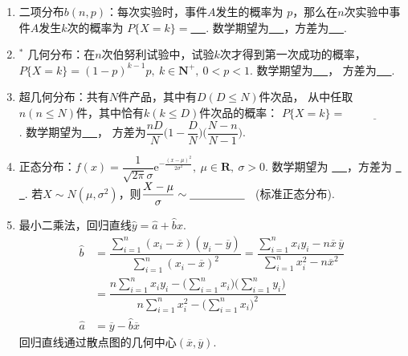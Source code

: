 \documentclass{article}
\newif\ifte
\newcommand{\e}{\mathrm{e}}
\renewcommand\leq\leqslant
\begin{document}
\begin{multicols}{2}
\begin{enumerate}[leftmargin=20pt]
\item 二项分布$ b(n,p) $：每次实验时，事件$ A $发生的概率为
$ p $，那么在$ n $次实验中事件$ A $发生$ k $次的概率为
$ P\{X=k\}= $\underline{\ \ifte $ C_n^kp^k(1-p)^{n-k} $
    \else \hspace{2cm} \fi\ }. 数学期望为\underline{\ \ifte 
$ np $ \else \hspace{1cm} \fi\ }，方差为\underline{\ \ifte 
$ np(1-p) $ \else \hspace{2cm} \fi\ }. 

\item $^*$ 几何分布：在$ n $次伯努利试验中，试验$ k $次才得到第一次成功的概率，$ P\{X=k\}=(1-p)^{k-1}p ,\ k\in \textbf{N}^+,\ 0<p<1 $. 
数学期望为\underline{\ \ifte $ \dfrac{1}{p} $\else \hspace{1cm} \fi\ }，
方差为\underline{\ \ifte $ \dfrac{1-p}{p^2} $\else \hspace{2cm} \fi\ }. 

\item 超几何分布：共有$ N $件产品，其中有$ D (D\leq N) $件次品，
从中任取$ n(n\leq N)$件，其中恰有$ k(k\leq D) $件次品的概率：
$ P\{X=k\}=\underline{\ \ifte \dfrac{C_D^kC_{N-D}^{n-k}}{C_N^n}
\else \hspace{2cm} \fi\ } $. 数学期望为\underline{\ \ifte 
$ \dfrac{nD}{N} $\else \hspace{1cm} \fi\ }，
方差为$ \dfrac{nD}{N}\Big(1-\dfrac{D}{N}
\Big)\Big(\dfrac{N-n}{N-1}\Big) $.

\item 正态分布：$ f(x)=\dfrac{1}{\sqrt{2\pi}\sigma}\e^{-\frac{(x-\mu)^2}
    {2\sigma^2}},\ \mu \in \textbf{R},\ \sigma>0 $. 数学期望为
\underline{\ \ifte $ \mu $\else \hspace{1cm} \fi\ }，方差为
\underline{\ \ifte $ \sigma^2 $\else \hspace{1cm} \fi\ }. 
若$ X\sim N(\mu,\sigma^2) $，则$ \dfrac{X-\mu}{\sigma}
\sim \underline{\ \ifte N(0,1)\else \hspace{1.5cm} \fi\ } $
\ (标准正态分布). 

\item 最小二乘法，回归直线$ \hat{y}=\hat{a}+\hat{b}x $. 
\begin{align*}
    \hat{b} &=\dfrac{\sum\limits_{i=1}^{n}(x_i-\overline{x})(y_i-\overline{y})}{
        \sum\limits_{i=1}^{n}(x_i-\overline{x})^2}     
    =\dfrac{\sum\limits_{i=1}^{n}x_iy_i-n\overline{x}\, \overline{y}}{\sum\limits_{i=1}^{n}x_i^2-n\overline{x}^2} \\
    &=\dfrac{n\sum\limits_{i=1}^{n}x_iy_i-
        \Big(\sum\limits_{i=1}^{n}x_i\Big)
        \Big(\sum\limits_{i=1}^{n}y_i\Big)}{n\sum\limits_{i=1}^{n}x_i^2-
        \Big(\sum\limits_{i=1}^{n}x_i\Big)^2}\\
    \hat{a} &=\overline{y}-\hat{b}\overline{x}
\end{align*}
回归直线通过散点图的几何中心$ (\overline{x},\overline{y}) $. 


\end{enumerate}
\end{multicols}
\end{document}
